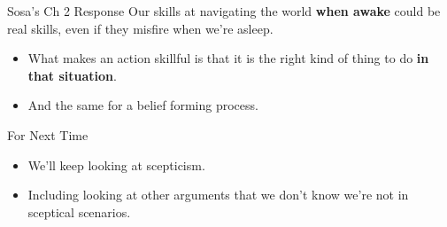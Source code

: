 \documentclass[
  17pt,
  letterpaper,
  ignorenonframetext,
  aspectratio=169,
]{beamer}
\providecommand{\tightlist}{%
  \setlength{\itemsep}{0pt}\setlength{\parskip}{0pt}}\usepackage{longtable,booktabs,array}
\begin{document}
\begin{frame}{Sosa's Ch 2 Response}
\protect\hypertarget{sosas-ch-2-response-1}{}
Our skills at navigating the world \textbf{when awake} could be real
skills, even if they misfire when we're asleep.

\begin{itemize}[<+->]
\tightlist
\item
  What makes an action skillful is that it is the right kind of thing to
  do \textbf{in that situation}.
\item
  And the same for a belief forming process.
\end{itemize}
\end{frame}

\begin{frame}{For Next Time}
\protect\hypertarget{for-next-time}{}
\begin{itemize}[<+->]
\tightlist
\item
  We'll keep looking at scepticism.
\item
  Including looking at other arguments that we don't know we're not in
  sceptical scenarios.
\end{itemize}
\end{frame}
\end{document}
